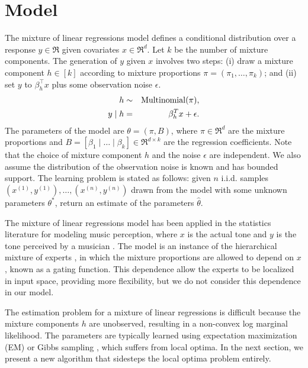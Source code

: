 \section{Model}
\label{sec:model}

\newcommand{\xn}[1]{x^{(#1)}}
\newcommand{\xni}{\xn{i}}
\newcommand{\yn}[1]{y^{(#1)}}
\newcommand{\yni}{\yn{i}}

The mixture of linear regressions model \citep{VieleTong2002} defines
a conditional distribution over a response $y \in \Re$
given covariates $x \in \Re^d$.
Let $k$ be the number of mixture components.
The generation of $y$ given $x$ involves two steps:
(i) draw a mixture component $h \in [k]$ according to mixture proportions
$\pi = (\pi_1, \dots, \pi_k)$;
and (ii) set $y$ to $\beta_h^\top x$ plus some observation noise $\epsilon$.
\begin{eqnarray}
  h &\sim& \operatorname{Multinomial}(\pi), \\
  y \mid h &=& \beta_{h}^T x + \epsilon.
\end{eqnarray}
The parameters of the model are $\theta = (\pi, B)$,
where $\pi \in \Re^d$ are the mixture proportions and
$B = [\beta_1 \mid \dots \mid \beta_k] \in \Re^{d \times k}$
are the regression coefficients.
Note that the choice of mixture component $h$ and the noise $\epsilon$ are independent.
We also assume the distribution of the observation noise is known and has bounded support.
The learning problem is stated as follows:
given $n$ i.i.d. samples $(\xn{1}, \yn{1}), \dots, (\xn{n}, \yn{n})$
drawn from the model with some unknown parameters $\theta^*$,
return an estimate of the parameters $\hat\theta$.

The mixture of linear regressions model has been applied
in the statistics literature for modeling music perception, where $x$ is the
actual tone and $y$ is the tone perceived by a musician \cite{VieleTong2002}.
The model is an instance of the hierarchical mixture of experts
\cite{jacobs91experts}, in which the mixture proportions are allowed to depend
on $x$, known as a gating function.
This dependence allow the experts to be localized in input space,
providing more flexibility, but we do not consider this dependence in our model.

The estimation problem for a mixture of linear regressions is difficult because
the mixture components $h$ are unobserved,
resulting in a non-convex log marginal likelihood.
The parameters are typically learned using
expectation maximization (EM) or Gibbs sampling \cite{VieleTong2002},
which suffers from local optima.
In the next section, we present a new algorithm
that sidesteps the local optima problem entirely.
